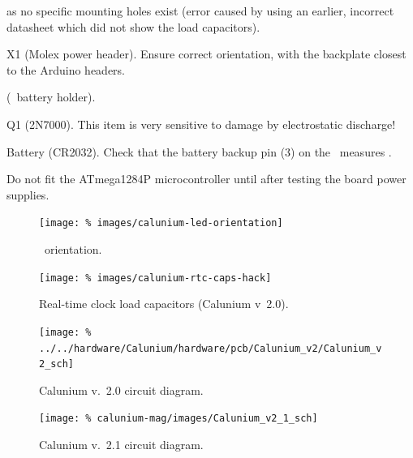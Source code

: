 \begin{buildorder}
  as no specific mounting holes exist (error caused by using an
  earlier, incorrect datasheet which did not show the load
  capacitors).
\item X1 (Molex power header). Ensure correct orientation, with the
  backplate closest to the Arduino headers.
\item {} (\rtc\ battery holder).
\item Q1 (2N7000). This item is very sensitive to damage by
  electrostatic discharge!
\item Battery (CR2032). Check that the battery backup pin (3) on the
  \rtc\ measures .
\item {}
\end{buildorder}
Do not fit the ATmega1284P microcontroller until after testing the
board power supplies.

\begin{figure}
  \centering
  \texttt{[image: \%
    images/calunium-led-orientation]}
  \caption[LED orientation]{\led\ orientation. }
  \label{fig:calunium-led-orientation}
\end{figure}
\begin{figure}
  \centering
  \texttt{[image: \%
    images/calunium-rtc-caps-hack]}
  \caption[Real-time clock load capacitors (Calunium v~2.0)]{%
    Real-time clock load capacitors (Calunium v~2.0). }
  \label{fig:calunium-rtc-caps-hack}
\end{figure}


\begin{landscape}
  \begin{figure}[p]
    \centering
    \texttt{[image: \%
      ../../hardware/Calunium/hardware/pcb/Calunium\_v2/Calunium\_v2\_sch]}  
    \caption{Calunium v.~2.0 circuit diagram.}
    \label{fig:calunium-v2.0-cct-diag}
  \end{figure}
  \begin{figure}[p]
    \centering
    \texttt{[image: \%
      calunium-mag/images/Calunium\_v2\_1\_sch]}
    \caption{Calunium v.~2.1 circuit diagram.}
    \label{fig:calunium-v2.1-cct-diag}
  \end{figure}
\end{landscape}

